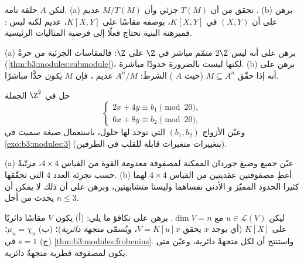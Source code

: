 \begin{exercise}[$\star\star$]\label{exo:b3:modules:5}
لتكن $A$ حلقة تامة. (a) تحقق من أن $T(M)$  جزئي وأن $M/T(M)$
عديم . (b) برهن على أن  $(X, Y)$ في $K[X,Y]$،
بوصفه مقاسًا على $K[X,Y]$، عديم  لكنه ليس : فمبرهنة
البنية تحتاج فعلًا إلى فرضية المثاليات الرئيسية.
\end{exercise}

\begin{exercise}[$\star\star$]\label{exo:b3:modules:6}
(a) برهن على أنه ليس  $2\Z$ متمّم مباشر في  $\Z$ على $\Z$:
فالمقاسات الجزئية من  حرةٌ (\cref{thm:b3:modules:submodule})، لكنها ليست
بالضرورة حدودًا مباشرة. (b) برهن على أنه إذا حقّق $M \subseteq A^n$ (حيث
$A$ ) الشرطَ: $A^n/M$ عديم ، فإن $M$
\emph{يكون} حدًّا مباشرًا.
\end{exercise}

\begin{exercise}[$\star\star$]\label{exo:b3:modules:7}
حل في $\Z^2$ الجملة
\[
\begin{cases}
2x + 4y \equiv b_1 \pmod{20},\\
6x + 8y \equiv b_2 \pmod{20},
\end{cases}
\]
وعيّن الأزواج $(b_1, b_2)$ التي توجد لها حلول، باستعمال صيغة
سميث في \cref{exo:b3:modules:3} (بتغييرات متغيرات قابلة للقلب في الطرفين).
\end{exercise}

\begin{exercise}[$\star\star$]\label{exo:b3:modules:8}
(a) عيّن جميع  وصيغ جوردان الممكنة لمصفوفة معدومة
القوة من القياس $4 \times 4$، مرتّبةً حسب تجزئة العدد $4$ التي
تحقّقها.
(b) أعطِ مصفوفتين عقديتين من القياس $4\times4$ لهما كثيرا الحدود
المميّز \emph{و} الأدنى نفساهما وليستا متشابهتين، وبرهن على أن
ذلك لا يمكن أن يحدث من أجل $n \leq 3$.
\end{exercise}

\begin{exercise}[$\star\star\star$]\label{exo:b3:modules:9}
ليكن $u \in \mathcal L(V)$ مع $\dim V = n$. برهن على تكافؤ ما يلي: (أ) يكون
$V$ مقاسًا دائريًا على $K[X]$ (أي يوجد $x$ يحقق $V = K[u]x$،
ويُسمّى \emph{متجهة دائرية})؛ (ب) $\mu_u = \chi_u$؛ (ج)
$s = 1$ في \cref{thm:b3:modules:frobenius}. واستنتج أن لكل  متجهةً
دائرية، وعيّن متى يكون لمصفوفة قطرية متجهةٌ دائرية.
\end{exercise}

